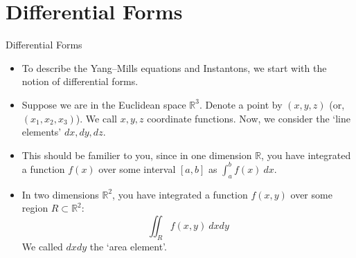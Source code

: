 \documentclass{beamer}
\theoremstyle{definition}
\begin{document}
	\section{Differential Forms}
	\begin{frame}{Differential Forms}{}
		\begin{itemize}
            \item<1-> {To describe the Yang--Mills equations and Instantons, we start with the notion of differential forms.}
            \item<2-> {Suppose we are in the Euclidean space $\mathbb{R}^3$. Denote a point by $(x, y, z)$ (or, $(x_1, x_2, x_3)$). We call $x, y, z$ coordinate functions. Now, we consider the `line elements' $dx, dy, dz$.}
            \item<3-> {This should be familier to you, since in one dimension $\mathbb{R}$, you have integrated a function $f(x)$ over some interval $[a, b]$ as $\int_a^b f(x)\ dx$.}
            \item<4-> {In two dimensions $\mathbb{R}^2$, you have integrated a function $f(x, y)$ over some region $R \subset \mathbb{R}^2$:
            $$\iint_R f(x, y)\ dxdy$$
            We called $dxdy$ the `area element'.}
        \end{itemize}
	\end{frame}
\end{document}
